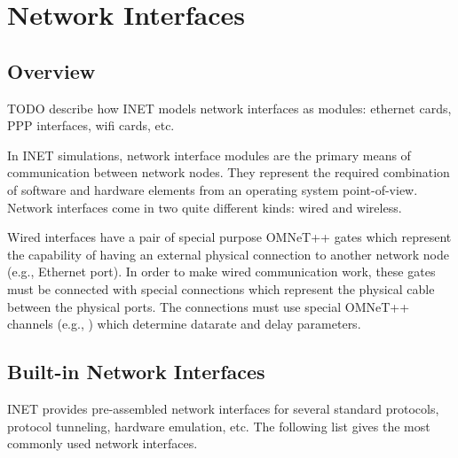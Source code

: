 \chapter{Network Interfaces}
\label{cha:network-interfaces}

\section{Overview}


TODO describe how INET models network interfaces as modules: ethernet cards, PPP
interfaces, wifi cards, etc.

In INET simulations, network interface modules are the primary means of
communication between network nodes. They represent the required
combination of software and hardware elements from an operating system
point-of-view. Network interfaces come in two quite different kinds: wired
and wireless.

Wired interfaces have a pair of special purpose OMNeT++ gates which represent
the capability of having an external physical connection to another network
node (e.g., Ethernet port). In order to make wired communication work,
these gates must be connected with special connections which represent the
physical cable between the physical ports. The connections must use special
OMNeT++ channels (e.g., ) which determine datarate
and delay parameters.

\section{Built-in Network Interfaces}

INET provides pre-assembled network interfaces for several standard
protocols, protocol tunneling, hardware emulation, etc. The following list
gives the most commonly used network interfaces.

